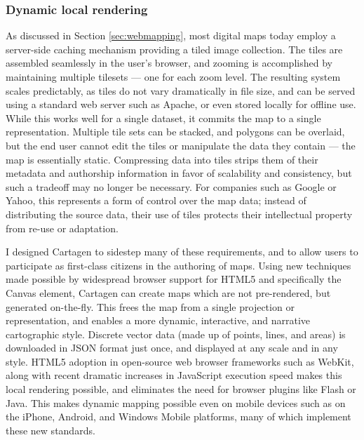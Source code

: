 \documentclass[11pt,oneside,notitlepage]{report}
\begin{document}
{{\subsubsection{Dynamic local rendering}

As discussed in Section \ref{sec:webmapping}, most digital maps today employ a server-side caching mechanism providing a tiled image collection. The tiles are assembled seamlessly in the user's browser, and zooming is accomplished by maintaining multiple tilesets --- one for each zoom level. The resulting system scales predictably, as tiles do not vary dramatically in file size, and can be served using a standard web server such as Apache, or even stored locally for offline use. While this works well for a single dataset, it commits the map to a single representation. Multiple tile sets can be stacked, and polygons can be overlaid, but the end user cannot edit the tiles or manipulate the data they contain --- the map is essentially static. Compressing data into tiles strips them of their metadata and authorship information in favor of scalability and consistency, but such a tradeoff may no longer be necessary. For companies such as Google or Yahoo, this represents a form of control over the map data; instead of distributing the source data, their use of tiles protects their intellectual property from re-use or adaptation.  

I designed Cartagen to sidestep many of these requirements, and to allow users to participate as first-class citizens in the authoring of maps. Using new techniques made possible by widespread browser support for HTML5 and specifically the Canvas element, Cartagen can create maps which are not pre-rendered, but generated on-the-fly. This frees the map from a single projection or representation, and enables a more dynamic, interactive, and narrative cartographic style. Discrete vector data (made up of points, lines, and areas) is downloaded in JSON format just once, and displayed at any scale and in any style. HTML5 adoption in open-source web browser frameworks such as WebKit, along with recent dramatic increases in JavaScript execution speed makes this local rendering possible, and eliminates the need for browser plugins like Flash or Java. This makes dynamic mapping possible even on mobile devices such as on the iPhone, Android, and Windows Mobile platforms, many of which implement these new standards. 

}}
\end{document}
